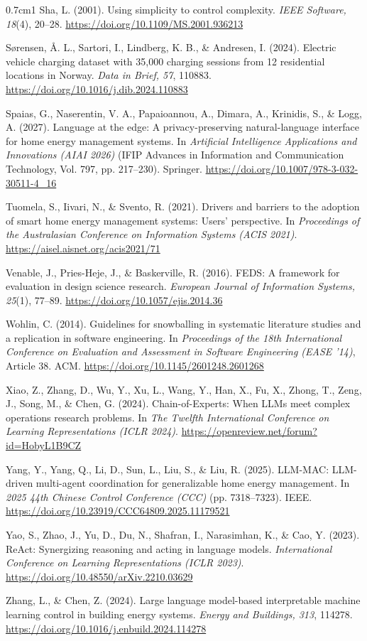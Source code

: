 \documentclass[12pt,a4paper]{report}
\begin{document}
\begin{hangparas}{0.7cm}{1}
Sha, L. (2001). Using simplicity to control complexity. \textit{IEEE
Software, 18}(4), 20--28. \url{https://doi.org/10.1109/MS.2001.936213}

Sørensen, Å. L., Sartori, I., Lindberg, K. B., \& Andresen, I. (2024).
Electric vehicle charging dataset with 35,000 charging sessions from 12
residential locations in Norway. \textit{Data in Brief, 57}, 110883.
\url{https://doi.org/10.1016/j.dib.2024.110883}

Spaias, G., Naserentin, V. A., Papaioannou, A., Dimara, A., Krinidis,
S., \& Logg, A. (2027). Language at the edge: A privacy-preserving
natural-language interface for home energy management systems. In
\textit{Artificial Intelligence Applications and Innovations (AIAI
2026)} (IFIP Advances in Information and Communication Technology, Vol.
797, pp. 217--230). Springer.
\url{https://doi.org/10.1007/978-3-032-30511-4_16}

Tuomela, S., Iivari, N., \& Svento, R. (2021). Drivers and barriers to
the adoption of smart home energy management systems: Users'
perspective. In \textit{Proceedings of the Australasian Conference on
Information Systems (ACIS 2021)}.
\url{https://aisel.aisnet.org/acis2021/71}

Venable, J., Pries-Heje, J., \& Baskerville, R. (2016). FEDS: A
framework for evaluation in design science research. \textit{European
Journal of Information Systems, 25}(1), 77--89.
\url{https://doi.org/10.1057/ejis.2014.36}

Wohlin, C. (2014). Guidelines for snowballing in systematic literature
studies and a replication in software engineering. In
\textit{Proceedings of the 18th International Conference on Evaluation
and Assessment in Software Engineering (EASE '14)}, Article 38. ACM.
\url{https://doi.org/10.1145/2601248.2601268}

Xiao, Z., Zhang, D., Wu, Y., Xu, L., Wang, Y., Han, X., Fu, X., Zhong,
T., Zeng, J., Song, M., \& Chen, G. (2024). Chain-of-Experts: When LLMs
meet complex operations research problems. In \textit{The Twelfth
International Conference on Learning Representations (ICLR 2024)}.
\url{https://openreview.net/forum?id=HobyL1B9CZ}

Yang, Y., Yang, Q., Li, D., Sun, L., Liu, S., \& Liu, R. (2025).
LLM-MAC: LLM-driven multi-agent coordination for generalizable home
energy management. In \textit{2025 44th Chinese Control Conference
(CCC)} (pp. 7318--7323). IEEE.
\url{https://doi.org/10.23919/CCC64809.2025.11179521}

Yao, S., Zhao, J., Yu, D., Du, N., Shafran, I., Narasimhan, K., \& Cao,
Y. (2023). ReAct: Synergizing reasoning and acting in language models.
\textit{International Conference on Learning Representations (ICLR
2023)}. \url{https://doi.org/10.48550/arXiv.2210.03629}

Zhang, L., \& Chen, Z. (2024). Large language model-based interpretable
machine learning control in building energy systems. \textit{Energy and
Buildings, 313}, 114278.
\url{https://doi.org/10.1016/j.enbuild.2024.114278}

\end{hangparas}
\end{document}
